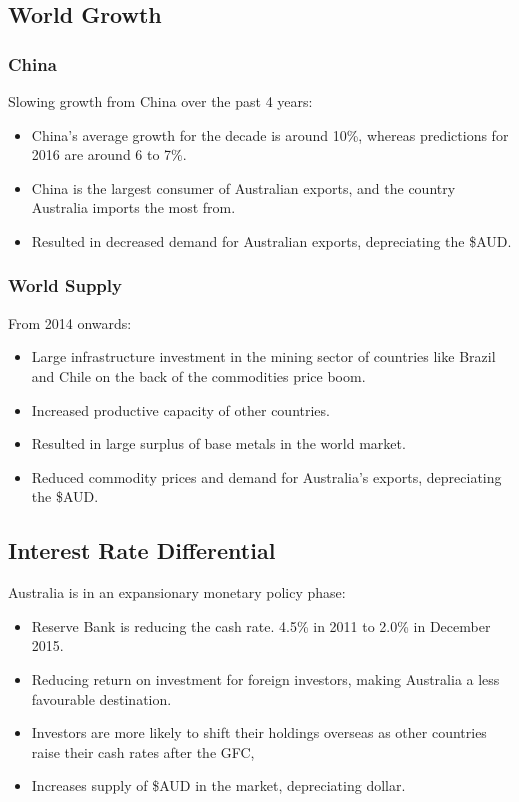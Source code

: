 \documentclass[a4paper,11pt]{report}
\begin{document}
\subsection{World Growth}

\subsubsection{China}

Slowing growth from China over the past 4 years:

\begin{itemize}
\item China's average growth for the decade is around 10\%, whereas predictions
	for 2016 are around 6 to 7\%.
\item China is the largest consumer of Australian exports, and the country
	Australia imports the most from.
\item Resulted in decreased demand for Australian exports, depreciating the
	\$AUD.
\end{itemize}

\subsubsection{World Supply}

From 2014 onwards:

\begin{itemize}
\item Large infrastructure investment in the mining sector of countries like
	Brazil and Chile on the back of the commodities price boom.
\item Increased productive capacity of other countries.
\item Resulted in large surplus of base metals in the world market.
\item Reduced commodity prices and demand for Australia's exports, depreciating
	the \$AUD.
\end{itemize}

\subsection{Interest Rate Differential}

Australia is in an expansionary monetary policy phase:

\begin{itemize}
\item Reserve Bank is reducing the cash rate. 4.5\% in 2011 to 2.0\% in
	December 2015.
\item Reducing return on investment for foreign investors, making Australia a
	less favourable destination.
\item Investors are more likely to shift their holdings overseas as other
	countries raise their cash rates after the GFC,
\item Increases supply of \$AUD in the market, depreciating dollar.
\end{itemize}
\end{document}
